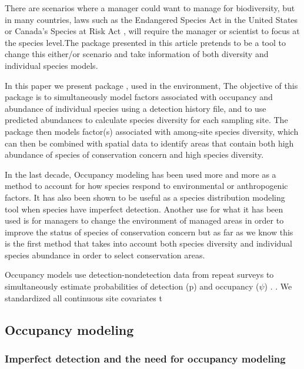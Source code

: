 \documentclass[article]{jss}
\begin{document}
There are scenarios where a manager could want to manage for
biodiversity, but in many countries, laws such as the Endangered Species
Act in the United States or Canada's Species at Risk Act
\citep{congress1973endangered, waples2013tale}, will require the manager
or scientist to focus at the species level.The package presented in this
article pretends to be a tool to change this either/or scenario and take
information of both diversity and individual species models.

In this paper we present package , used in the
 environment, The objective of this package is to
simultaneously model factors associated with occupancy and abundance of
individual species using a detection history file, and to use predicted
abundances to calculate species diversity for each sampling site. The
package then models factor(s) associated with among-site species
diversity, which can then be combined with spatial data to identify
areas that contain both high abundance of species of conservation
concern and high species diversity.

In the last decade, Occupancy modeling has been used more and more as a
method to account for how species respond to environmental or
anthropogenic factors. It has also been shown to be useful as a species
distribution modeling tool when species have imperfect detection.
Another use for what it has been used is for managers to change the
environment of managed areas in order to improve the status of species
of conservation concern
\citep{mackenzie_estimating_2002, mackenzie2006occupancy} but as far as
we know this is the first method that takes into account both species
diversity and individual species abundance in order to select
conservation areas.

Occupancy models use detection-nondetection data from repeat surveys to
simultaneously estimate probabilities of detection (p) and occupancy
(\(\psi\)) \citep{mackenzie2006occupancy}. \citep{burnham2003model}. We
standardized all continuous site covariates t

\subsection{Occupancy modeling}\label{occupancy-modeling}

\subsubsection{Imperfect detection and the need for occupancy
modeling}\label{imperfect-detection-and-the-need-for-occupancy-modeling}
\end{document}
